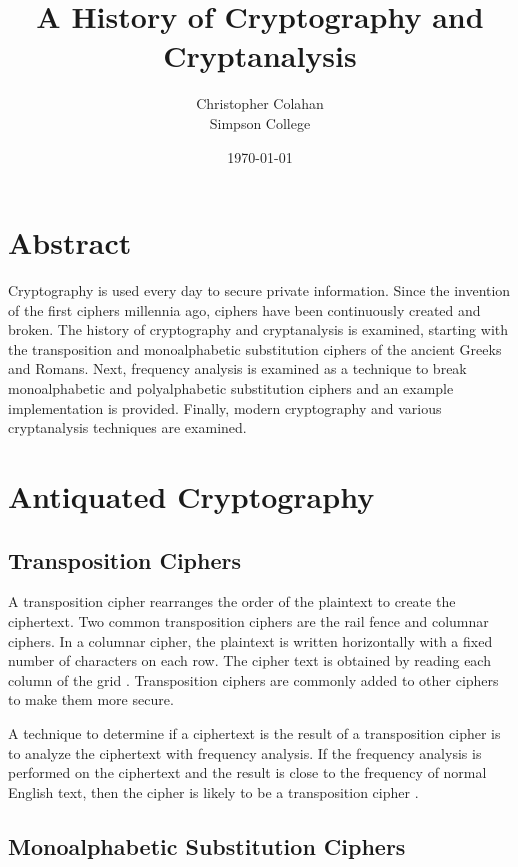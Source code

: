 \documentclass[12pt]{article}
\title{A History of Cryptography and Cryptanalysis}
\date{\today}
\author{Christopher Colahan\\ Simpson College}
\begin{document}
\maketitle
\newpage

\tableofcontents
\listoffigures
\newpage



\section{Abstract}
Cryptography is used every day to secure private information. Since the invention of the first ciphers
millennia ago, ciphers have been continuously created and broken. The history of cryptography and
cryptanalysis is examined, starting with the transposition and monoalphabetic substitution ciphers of the
ancient Greeks and Romans. Next, frequency analysis is examined as a technique to break monoalphabetic
and polyalphabetic substitution ciphers and an example implementation is provided. Finally, modern cryptography and various cryptanalysis techniques are examined.

\section{Antiquated Cryptography}
\subsection{Transposition Ciphers}
A transposition cipher rearranges the order of the plaintext to create the ciphertext. Two common transposition ciphers are the rail fence and columnar ciphers. In a columnar cipher, the plaintext is written horizontally with a fixed number of characters on each row. The cipher text is obtained by reading each column of the grid \cite{appcrypt}. Transposition ciphers are commonly added to other ciphers to make them more secure.

A technique to determine if a ciphertext is the result of a transposition cipher is to analyze the ciphertext with frequency analysis. If the frequency analysis is performed on the ciphertext and the result is close to the frequency of normal English text, then the cipher is likely to be a transposition cipher \cite{appcrypt}.

\subsection{Monoalphabetic Substitution Ciphers}
\end{document}
